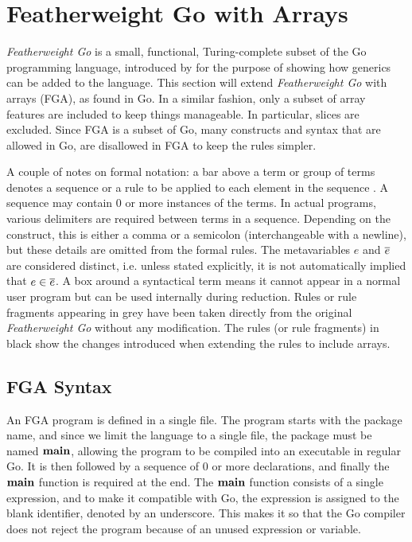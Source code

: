 \section{Featherweight Go with Arrays}
\label{ch:fg}

\emph{Featherweight Go} is a small, functional, Turing-complete subset of the Go
programming language, introduced by \textcite{fg} for the purpose of showing
how generics can be added to the language. This section will
extend \emph{Featherweight Go} with arrays (FGA), as found in Go. In a similar
fashion, only a subset of array features are included to keep things manageable.
In particular, slices are excluded. Since FGA is a subset of Go, many constructs
and syntax that are allowed in Go, are disallowed in FGA to keep the rules
simpler.

A couple of notes on formal notation: a bar above a term or group of terms
denotes a sequence or a rule to be applied to each element in the sequence
\autocite{newOldLang}. A sequence may contain 0 or more instances of the terms.
In actual programs, various delimiters are required between terms in a sequence.
Depending on the construct, this is either a comma or a semicolon
(interchangeable with a newline), but these details are omitted from the formal
rules. The metavariables $e$ and $\overline{e}$ are considered distinct, i.e. unless
stated explicitly, it is not automatically implied that $e \in \overline{e}$. A box
around a syntactical term means it cannot appear in a normal user program but
can be used internally during reduction. Rules or rule fragments appearing in
grey have been taken directly from the original \emph{Featherweight Go}
\autocite{fg} without any modification. The rules (or rule fragments) in black
show the changes introduced when extending the rules to include arrays.

\subsection{FGA Syntax}

An FGA program is defined in a single file. The program starts with the package
name, and since we limit the language to a single file, the package must be
named $\texttt{\bf main}$, allowing the program to be compiled into an executable in regular
Go. It is then followed by a sequence of 0 or more declarations, and finally the
$\texttt{\bf main}$ function is required at the end. The $\texttt{\bf main}$ function consists of a
single expression, and to make it compatible with Go, the expression is assigned
to the blank identifier, denoted by an underscore. This makes it so that the Go
compiler does not reject the program because of an unused expression or
variable.

